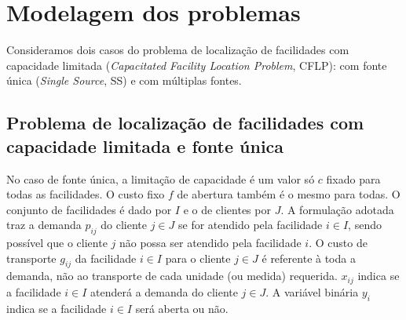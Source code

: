 \documentclass[]{article}
\title{}
\begin{document}
\maketitle

\begin{abstract}

\end{abstract}


\section{Modelagem dos problemas}

	Consideramos dois casos do problema de localização de facilidades com capacidade limitada 
	(\textit{Capacitated Facility Location Problem}, CFLP):
	com fonte única (\textit{Single Source}, SS) 
	e com múltiplas fontes. 
	
	\subsection{Problema de localização de facilidades com capacidade limitada e fonte única}
	
	No caso de fonte única, a limitação de capacidade é um valor só $c$ fixado para todas as facilidades.
	O custo fixo $f$ de abertura também é o mesmo para todas.
	O conjunto de facilidades é dado por $I$ e o de clientes por $J$.
	A formulação adotada traz a demanda $p_{ij}$ do cliente $j \in J$ se for atendido pela facilidade $i \in I$, 
	sendo possível que o cliente $j$ não possa ser atendido pela facilidade $i$.
	O custo de transporte $g_{ij}$ da facilidade $i \in I$ para o cliente $j \in J$ é referente à toda a demanda, não ao transporte de cada unidade (ou medida) requerida.
	$x_{ij}$ indica se a facilidade $i \in I$ atenderá a demanda do cliente $j \in J$.
	A variável binária $y_i$ indica se a facilidade $i \in I$ será aberta ou não.
	
	
	\begin{equation}
		
	\end{equation}	
\end{document}
